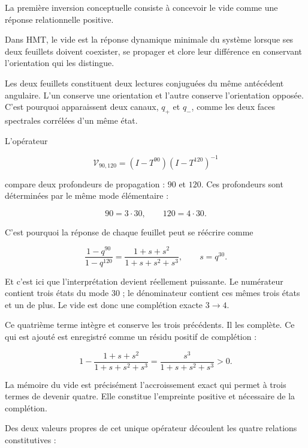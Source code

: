 La première inversion conceptuelle consiste à concevoir le vide comme une réponse relationnelle positive.\par

Dans HMT, le vide est la réponse dynamique minimale du système lorsque ses deux feuillets doivent coexister, se propager et clore leur différence en conservant l’orientation qui les distingue.\par

Les deux feuillets constituent deux lectures conjuguées du même antécédent angulaire. L’un conserve une orientation et l’autre conserve l’orientation opposée. C’est pourquoi apparaissent deux canaux, \(q_+\) et \(q_-\), comme les deux faces spectrales corrélées d’un même état.\par

L'opérateur\par

\[
\mathcal V_{90,120}
=
(I-T^{90})(I-T^{120})^{-1}
\]

compare deux profondeurs de propagation : \(90\) et \(120\). Ces profondeurs sont déterminées par le même mode élémentaire :\par

\[
90=3\cdot30,
\qquad
120=4\cdot30.
\]

C’est pourquoi la réponse de chaque feuillet peut se réécrire comme\par

\[
\frac{1-q^{90}}{1-q^{120}}
=
\frac{1+s+s^2}{1+s+s^2+s^3},
\qquad
s=q^{30}.
\]

Et c’est ici que l’interprétation devient réellement puissante. Le numérateur contient trois états du mode \(30\) ; le dénominateur contient ces mêmes trois états et un de plus. Le vide est donc une complétion exacte \(3\to4\).\par

Ce quatrième terme intègre et conserve les trois précédents. Il les complète. Ce qui est ajouté est enregistré comme un résidu positif de complétion :\par

\[
1-\frac{1+s+s^2}{1+s+s^2+s^3}
=
\frac{s^3}{1+s+s^2+s^3}>0.
\]

La mémoire du vide est précisément l’accroissement exact qui permet à trois termes de devenir quatre. Elle constitue l’empreinte positive et nécessaire de la complétion.\par

Des deux valeurs propres de cet unique opérateur découlent les quatre relations constitutives :\par

